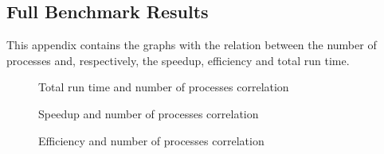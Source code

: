 \subsection{Full Benchmark Results}

This appendix contains the graphs with the relation between the number of processes and, respectively, the speedup, efficiency and total run time.

\begin{figure}[!ht]
    \centering
    
    
    
    
    \caption{Total run time and number of processes correlation}
    \label{fig:exec_time}
\end{figure}

\begin{figure}[!ht]
    \centering
    
    
    
    
    \caption{Speedup and number of processes correlation}
    \label{fig:speedup}
\end{figure}

\begin{figure}[!ht]
    \centering
    
    
    
    
    \caption{Efficiency and number of processes correlation}
    \label{fig:efficiency}
\end{figure}
